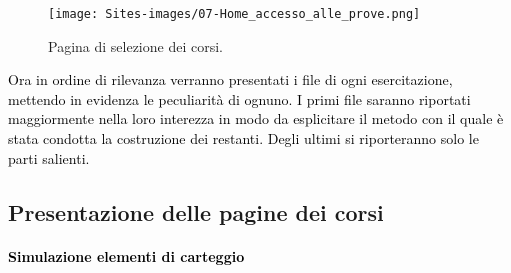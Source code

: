\begin{figure}[h]
	\begin{center}
		\texttt{[image: Sites-images/07-Home\_accesso\_alle\_prove.png]}
		\caption{Pagina di selezione dei corsi.}
	\end{center}
\end{figure}

\textcolor{black}{Ora in ordine di rilevanza verranno presentati i file di ogni esercitazione, mettendo in evidenza le peculiarità di ognuno. I primi file saranno riportati maggiormente nella loro interezza in modo da esplicitare il metodo con il quale è stata condotta la costruzione dei restanti. Degli ultimi si riporteranno solo le parti salienti.}\\

\subsection{Presentazione delle pagine dei corsi}

\paragraph{\textcolor{black}{Simulazione elementi di carteggio}}\leavevmode\\

